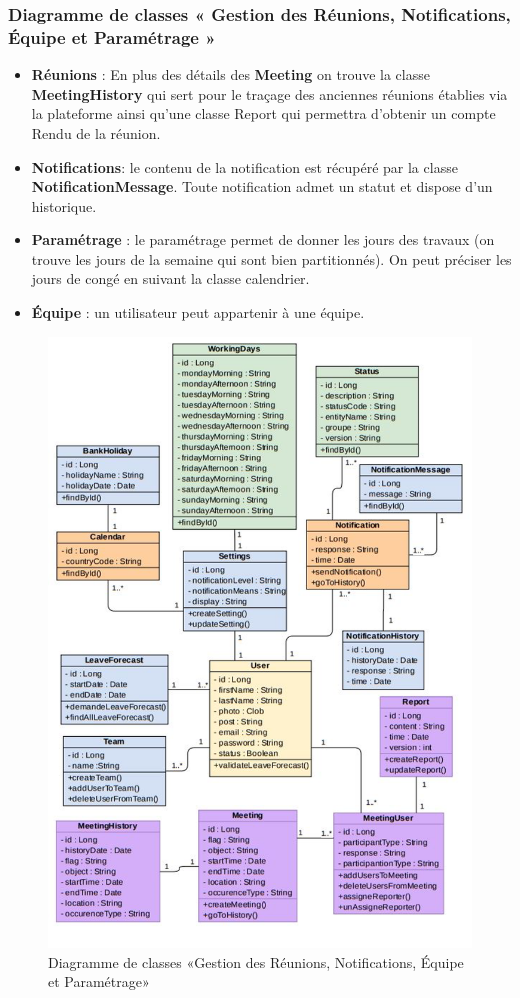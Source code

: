 \subsubsection{Diagramme de classes « Gestion des Réunions, Notifications, Équipe et Paramétrage  »}
\begin{itemize}
    \item \textbf{Réunions} : En plus des détails des \textbf{Meeting} on trouve la classe \textbf{MeetingHistory} qui sert pour le traçage  des anciennes réunions établies via la plateforme ainsi qu’une classe Report qui permettra d’obtenir un compte Rendu de la réunion.
    \item \textbf{Notifications}: le contenu de la notification est récupéré par la classe \textbf{NotificationMessage}. Toute notification admet un statut et dispose d’un historique.
    \item \textbf{Paramétrage} : le paramétrage permet de donner les jours des travaux (on trouve les jours de la semaine qui sont bien partitionnés). On peut préciser les jours de congé en suivant la classe calendrier.
	\item\textbf{Équipe} : un utilisateur peut appartenir à une équipe.
\end{itemize}\newpage
\begin{figure}[h]
    \centering
    \includegraphics[scale=0.83]{figures/33anis2.png}
    \caption{Diagramme de classes «Gestion des Réunions, Notifications, Équipe et Paramétrage»}
    \label{fig:class_P2}
\end{figure}\newpage
